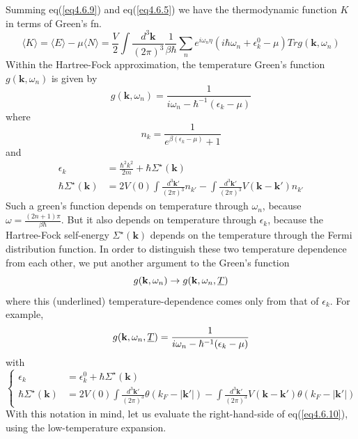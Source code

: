 Summing eq(\ref{eq4.6.9}) and eq(\ref{eq4.6.5}) we have the thermodynamic function $K$ in terms of Green's fn.
\begin{equation}\label{eq4.6.10}
\langle K \rangle=\langle E \rangle-\mu\langle N \rangle=\frac{V}{2} \int \frac{d^3 \mathbf{k}}{(2\pi)^3} \frac{1}{\beta\hbar} \sum_n e^{i\omega_n \eta}\left(i\hbar\omega_n+\epsilon_k^0-\mu\right)Tr g(\mathbf{k},\omega_n)
\end{equation}
Within the Hartree-Fock approximation, the temperature Green's function $g(\mathbf{k},\omega_n)$ is given by
\begin{equation}
g(\mathbf{k},\omega_n)=\frac{1}{i\omega_n-\hbar^{-1}(\epsilon_k-\mu)}
\end{equation}
where 
\[
n_k=\frac{1}{e^{\beta(\epsilon_k-\mu)}+1}
\]
and
\[
\begin{aligned}
\epsilon_k&=\frac{\hbar^2 k^2}{2m}+\hbar\Sigma^\star(\mathbf{k})\\
\hbar \Sigma^\star(\mathbf{k})&=2V(0)\int\frac{d^3\mathbf{k}'}{(2\pi)^3}n_{k'}-\int\frac{d^3\mathbf{k}'}{(2\pi)^3}V(\mathbf{k}-\mathbf{k}')n_{k'}
\end{aligned}
\]
Such a green's function depends on temperature through $\omega_n$, because $\omega=\frac{(2n+1)\pi}{\beta\hbar}$.
But it also depends on temperature through $\epsilon_k$, because the Hartree-Fock self-energy $\Sigma^\star(\mathbf{k})$ depends on the temperature through the Fermi distribution function.
In order to distinguish these two temperature dependence from each other, we put another argument to the Green's function
\[
g(\mathbf{k},\omega_n)\to g(\mathbf{k},\omega_n,\uline{T})
\]
where this (underlined) temperature-dependence comes only from that of $\epsilon_k$.
For example,
\begin{equation}
g(\mathbf{k},\omega_n,\uline{T})=\frac{1}{i\omega_n-\hbar^{-1}(\epsilon_k-\mu)}
\end{equation}
with
\begin{equation}\tag{4.6.13$^\prime$}
\left\{
\begin{aligned}
\epsilon_k&=\epsilon_k^0+\hbar\Sigma^\star(\mathbf{k})\\
\hbar \Sigma^\star(\mathbf{k})&=2V(0)\int\frac{d^3\mathbf{k}'}{(2\pi)^3} \theta(k_F-|\mathbf{k}'|)-\int\frac{d^3\mathbf{k}'}{(2\pi)^3}V(\mathbf{k}-\mathbf{k}') \theta(k_F-|\mathbf{k}'|)
\end{aligned}
\right.
\end{equation}
With this notation in mind, let us evaluate the right-hand-side of eq(\ref{eq4.6.10}), using the low-temperature expansion.
